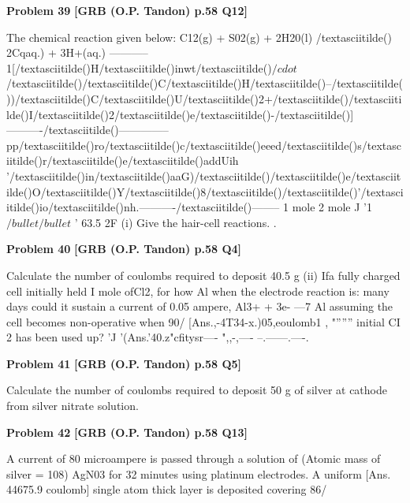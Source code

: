 \begin{problembox}
\textbf{Problem 39} \hfill \textbf{[GRB (O.P. Tandon) p.58 Q12]}
\label{q:ext-grb_all_questions-39}

The chemical reaction given below: 
C12(g) + S02(g) + 2H20(l) /textasciitilde() 
2Cqaq.) + 3H+(aq.) 
-----------1[/textasciitilde()H/textasciitilde()inwt/textasciitilde()$/cdot$/textasciitilde()/textasciitilde()C/textasciitilde()H/textasciitilde()--/textasciitilde())/textasciitilde()C/textasciitilde()U/textasciitilde()2+/textasciitilde()/textasciitilde()I/textasciitilde()2/textasciitilde()e/textasciitilde()-/textasciitilde()]----------/textasciitilde()--------------pp/textasciitilde()ro/textasciitilde()c/textasciitilde()eeed/textasciitilde()s/textasciitilde()r/textasciitilde()e/textasciitilde()addUih '/textasciitilde()in/textasciitilde()aaG)/textasciitilde()/textasciitilde()e/textasciitilde()O/textasciitilde()Y/textasciitilde()8/textasciitilde()/textasciitilde()'/textasciitilde()io/textasciitilde()nh.----------/textasciitilde()--------
1 mole 
2 mole 
J 
'1 
$/bullet$$/bullet$ ' 
63.5 
2F 
(i) Give the hair-cell reactions. 
.
\end{problembox}

\begin{problembox}
\textbf{Problem 40} \hfill \textbf{[GRB (O.P. Tandon) p.58 Q4]}
\label{q:ext-grb_all_questions-40}

Calculate the number of coulombs required to deposit 40.5 g 
(ii) Ifa fully charged cell initially held I mole ofCl2, for how 
Al when the electrode reaction is: 
many days could it sustain a current of 0.05 ampere, 
Al3+ + 3e- ---7 Al 
assuming the cell becomes non-operative when 90/%
[Ans.,-4T34-x.)05,eoulomb1
, 
"'''''' 
initial CI 2 has been used up? 
'J 
'(Ans.'40.z"cfitysr---- ",,-,---- --.------.----.
\end{problembox}

\begin{problembox}
\textbf{Problem 41} \hfill \textbf{[GRB (O.P. Tandon) p.58 Q5]}
\label{q:ext-grb_all_questions-41}

Calculate the number of coulombs required to deposit 50 g of 
silver at cathode from silver nitrate solution.
\end{problembox}

\begin{problembox}
\textbf{Problem 42} \hfill \textbf{[GRB (O.P. Tandon) p.58 Q13]}
\label{q:ext-grb_all_questions-42}

A current of 80 microampere is passed through a solution of 
(Atomic mass of silver = 108) 
AgN03 for 32 minutes using platinum electrodes. A uniform 
[Ans. 
44675.9 coulomb] 
single atom thick layer is deposited covering 86/%
\end{problembox}

